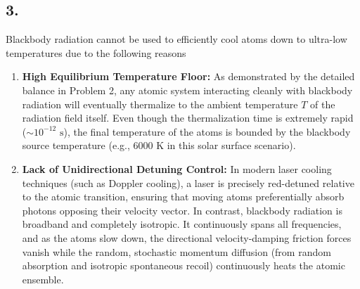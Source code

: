 \documentclass[11pt,a4paper]{article}
\begin{document}
\subsection*{3.}
Blackbody radiation cannot be used to efficiently cool atoms down to ultra-low temperatures due to the following reasons
\begin{enumerate}
    \item \textbf{High Equilibrium Temperature Floor:} As demonstrated by the detailed balance in Problem 2, any atomic system interacting cleanly with blackbody radiation will eventually thermalize to the ambient temperature $T$ of the radiation field itself. Even though the thermalization time is extremely rapid ($\sim 10^{-12}\text{ s}$), the final temperature of the atoms is bounded by the blackbody source temperature (e.g., $6000\text{ K}$ in this solar surface scenario).
    \item \textbf{Lack of Unidirectional Detuning Control:} In modern laser cooling techniques (such as Doppler cooling), a laser is precisely red-detuned relative to the atomic transition, ensuring that moving atoms preferentially absorb photons opposing their velocity vector. In contrast, blackbody radiation is broadband and completely isotropic. It continuously spans all frequencies, and as the atoms slow down, the directional velocity-damping friction forces vanish while the random, stochastic momentum diffusion (from random absorption and isotropic spontaneous recoil) continuously heats the atomic ensemble.
\end{enumerate}
\end{document}
